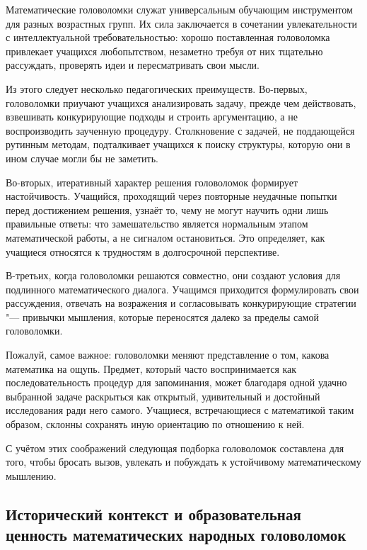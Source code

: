 \documentclass[a4paper,14pt]{extreport}
\theoremstyle{plain}
\theoremstyle{definition}
\theoremstyle{remark}
\begin{document}
Математические головоломки служат универсальным обучающим инструментом для разных возрастных групп. Их сила заключается в сочетании увлекательности с интеллектуальной требовательностью: хорошо поставленная головоломка привлекает учащихся любопытством, незаметно требуя от них тщательно рассуждать, проверять идеи и пересматривать свои мысли.

Из этого следует несколько педагогических преимуществ. Во-первых, головоломки приучают учащихся анализировать задачу, прежде чем действовать, взвешивать конкурирующие подходы и строить аргументацию, а не воспроизводить заученную процедуру. 
Столкновение с задачей, не поддающейся рутинным методам, подталкивает учащихся к поиску структуры, которую они в ином случае могли бы не заметить.

Во-вторых, итеративный характер решения головоломок формирует настойчивость. Учащийся, проходящий через повторные неудачные попытки перед достижением решения, узнаёт то, чему не могут научить одни лишь правильные ответы: что замешательство является нормальным этапом математической работы, а не сигналом остановиться. Это определяет, как учащиеся относятся к трудностям в долгосрочной перспективе.

В-третьих, когда головоломки решаются совместно, они создают условия для подлинного математического диалога. Учащимся приходится формулировать свои рассуждения, отвечать на возражения и согласовывать конкурирующие стратегии "--- привычки мышления, которые переносятся далеко за пределы самой головоломки.

Пожалуй, самое важное: головоломки меняют представление о том, какова математика на ощупь. Предмет, который часто воспринимается как последовательность процедур для запоминания, может благодаря одной удачно выбранной задаче раскрыться как открытый, удивительный и достойный исследования ради него самого. Учащиеся, встречающиеся с математикой таким образом, склонны сохранять иную ориентацию по отношению к ней.

С учётом этих соображений следующая подборка головоломок составлена для того, чтобы бросать вызов, увлекать и побуждать к устойчивому математическому мышлению.
\subsection{Исторический контекст и образовательная ценность математических народных головоломок}~\label{sec4.1.1}
\end{document}
